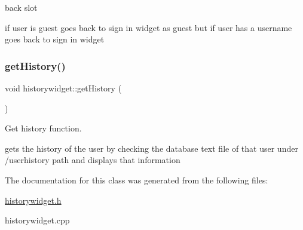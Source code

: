 back slot 

if user is guest goes back to sign in widget as guest but if user has a username goes back to sign in widget \mbox{\label{classhistorywidget_aa2edafd200341f9273bc3c8c4930902e}} 
\subsubsection{\texorpdfstring{get\+History()}{getHistory()}}
{\footnotesize\ttfamily void historywidget\+::get\+History (\begin{DoxyParamCaption}{ }\end{DoxyParamCaption})}



Get history function. 

gets the history of the user by checking the database text file of that user under /userhistory path and displays that information 

The documentation for this class was generated from the following files\+:\begin{DoxyCompactItemize}
\item 
\hyperlink{historywidget_8h}{historywidget.\+h}\item 
historywidget.\+cpp\end{DoxyCompactItemize}
